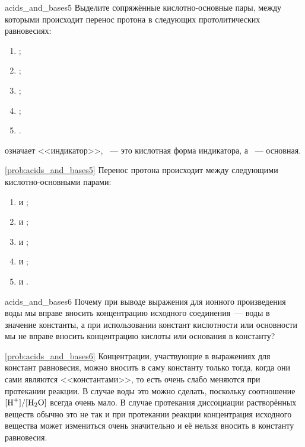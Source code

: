 \begin{problem}{}{acids_and_bases5}
    Выделите сопряжённые кислотно-основные пары, между которыми происходит перенос протона в следующих протолитических равновесиях:
    \begin{enumerate}[label=\arabic*)]
        \item {};
        \item {};
        \item {};
        \item {};
        \item {}.
    \end{enumerate}
    \textbf{} означает <<индикатор>>, \textbf{}~--- это кислотная форма индикатора, а \textbf{}~--- основная.
    \begin{sol}{\ref{prob:acids_and_bases5}}
        Перенос протона происходит между следующими кислотно-основными парами:
        \begin{enumerate}[label=\arabic*)]
            \item {} и ;
            \item {} и ;
            \item {} и ;
            \item {} и ;
            \item {} и .
        \end{enumerate}
    \end{sol}
\end{problem}

\begin{problem}{}{acids_and_bases6}
    Почему при выводе выражения для ионного произведения воды мы вправе вносить концентрацию исходного соединения~--- воды в значение константы, а при использовании констант кислотности или основности мы не вправе вносить концентрацию кислоты или основания в константу?
    \begin{sol}{\ref{prob:acids_and_bases6}}
        Концентрации, участвующие в выражениях для констант равновесия, можно вносить в саму константу только тогда, когда они сами являются <<константами>>, то есть очень слабо меняются при протекании реакции. В случае воды это можно сделать, поскольку соотношение $[\ce{H^+}]/[\ce{H2O}]$ всегда очень мало. В случае протекания диссоциации растворённых веществ обычно это не так и при протекании реакции концентрация исходного вещества может измениться очень значительно и её нельзя вносить в константу равновесия.
    \end{sol}
\end{problem}

